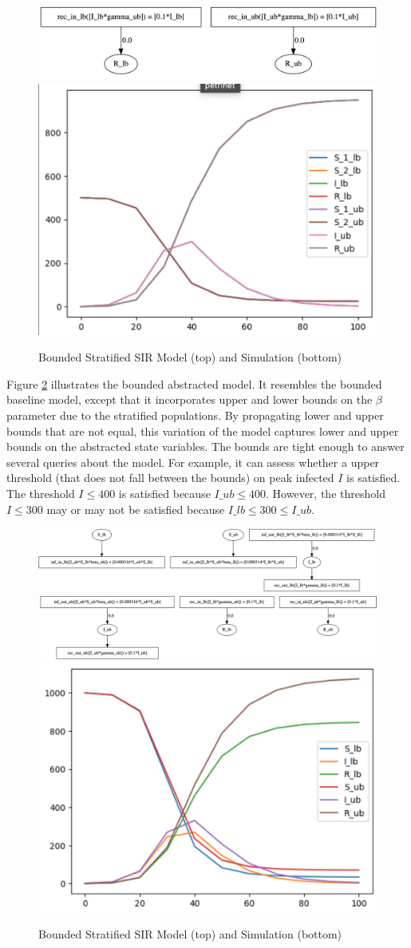 \begin{figure}[t]
    \includegraphics[width=0.4\linewidth,clip]{fig/sir/sir_bounded_stratified_5.pdf}\\
    \includegraphics[width=0.4\linewidth,clip]{fig/sir/sir_bounded_stratified_sim.pdf}
    \caption{\label{fig:sir_bounded_stratified} Bounded Stratified SIR Model (top) and Simulation (bottom)}
\end{figure}


Figure \ref{fig:sir_abstract_bounded_stratified}  illustrates the bounded abstracted model.  It resembles the bounded baseline model, except that it incorporates upper and lower bounds on the $\beta$ parameter due to the stratified populations.  By propagating lower and upper bounds that are not equal, this variation of the model captures lower and upper bounds on the abstracted state variables.  The bounds are tight enough to answer several queries about the model.  For example, it can assess whether a upper threshold (that does not fall between the bounds) on peak infected $I$ is satisfied.  The threshold $I \leq 400$ is satisfied because $I\_ub \leq 400$.  However, the threshold $I \leq 300$ may or may not be satisfied because $I\_lb \leq 300 \leq I\_ub$.

\begin{figure}[t]
    \centering
    \includegraphics[width=0.6\linewidth,clip]{fig/sir/sir_abstract_bounded_model_1.pdf}
    \includegraphics[width=0.6\linewidth,clip]{fig/sir/sir_abstract_bounded_model_2.pdf}
    \includegraphics[width=0.4\linewidth,clip]{fig/sir/sir_abstract_bounded_sim.pdf}
    \caption{\label{fig:sir_abstract_bounded_stratified} Bounded Stratified SIR Model (top) and Simulation (bottom)}
\end{figure}

